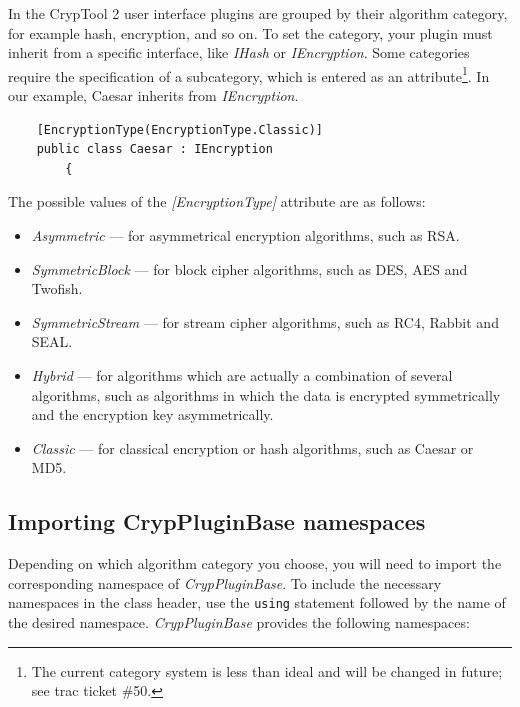 In the CrypTool 2 user interface plugins are grouped by their algorithm category, for example hash, encryption, and so on. To set the category, your plugin must inherit from a specific interface, like \textit{IHash} or \textit{IEncryption}. Some categories require the specification of a subcategory, which is entered as an attribute\footnote{The current category system is less than ideal and will be changed in future; see trac ticket \#50.}. In our example, Caesar inherits from \textit{IEncryption}.

\begin{lstlisting}
    [EncryptionType(EncryptionType.Classic)]
    public class Caesar : IEncryption
		{
\end{lstlisting}
\clearpage

The possible values of the \textit{[EncryptionType]} attribute are as follows:

\begin{itemize}
	\item \textit{Asymmetric} --- for asymmetrical encryption algorithms, such as RSA.
	\item \textit{SymmetricBlock} --- for block cipher algorithms, such as DES, AES and Twofish.
	\item \textit{SymmetricStream} --- for stream cipher algorithms, such as RC4, Rabbit and SEAL.
	\item \textit{Hybrid} --- for algorithms which are actually a combination of several algorithms, such as algorithms in which the data is encrypted symmetrically and the encryption key asymmetrically.
	\item \textit{Classic} --- for classical encryption or hash algorithms, such as Caesar or MD5.
\end{itemize}

\subsection{Importing CrypPluginBase namespaces}
\label{sec:ImportingCrypPluginBaseNamespaces}

Depending on which algorithm category you choose, you will need to import the corresponding name\-space of \textit{CrypPluginBase}. To include the necessary namespaces in the class header, use the \texttt{using} statement followed by the name of the desired namespace. \textit{CrypPluginBase} provides the following namespaces:

